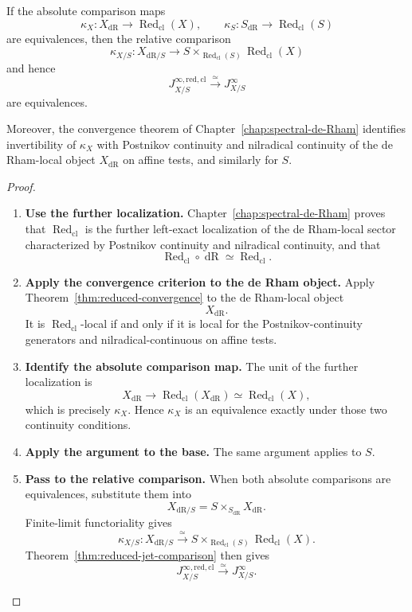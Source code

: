 \begin{corollary}
If the absolute comparison maps
\[
  \kappa_X:
  X_{\mathrm{dR}}
  \longrightarrow
  \operatorname{Red}_{\mathrm{cl}}(X),
  \qquad
  \kappa_S:
  S_{\mathrm{dR}}
  \longrightarrow
  \operatorname{Red}_{\mathrm{cl}}(S)
\]
are equivalences, then the relative comparison
\[
  \kappa_{X/S}:X_{\mathrm{dR}/S}\to S\times_{\operatorname{Red}_{\mathrm{cl}}(S)}\operatorname{Red}_{\mathrm{cl}}(X)
\]
and hence
\[
  J^{\infty,\mathrm{red,cl}}_{X/S}
  \xrightarrow{\simeq}
  J^\infty_{X/S}
\]
are equivalences.

Moreover, the convergence theorem of
Chapter~\ref{chap:spectral-de-Rham} identifies invertibility of \(\kappa_X\)
with Postnikov continuity and nilradical continuity of the de Rham-local object
\(X_{\mathrm{dR}}\) on affine tests, and similarly for \(S\).
\end{corollary}

\begin{proof}
\leavevmode
\begin{enumerate}[label=\textup{(\arabic*)}]
    \item \textbf{Use the further localization.}
Chapter~\ref{chap:spectral-de-Rham} proves that
\(\operatorname{Red}_{\mathrm{cl}}\) is the further left-exact localization of
the de Rham-local sector characterized by Postnikov continuity and nilradical
continuity, and that
\[
  \operatorname{Red}_{\mathrm{cl}}\circ\operatorname{dR}
  \simeq
  \operatorname{Red}_{\mathrm{cl}}.
\]

    \item \textbf{Apply the convergence criterion to the de Rham object.}
Apply Theorem~\ref{thm:reduced-convergence} to the de Rham-local object
\[
  X_{\mathrm{dR}}.
\]
It is \(\operatorname{Red}_{\mathrm{cl}}\)-local if and only if it is local for
the Postnikov-continuity generators and nilradical-continuous on affine tests.

    \item \textbf{Identify the absolute comparison map.}
The unit of the further localization is
\[
  X_{\mathrm{dR}}
  \longrightarrow
  \operatorname{Red}_{\mathrm{cl}}(X_{\mathrm{dR}})
  \simeq
  \operatorname{Red}_{\mathrm{cl}}(X),
\]
which is precisely \(\kappa_X\). Hence \(\kappa_X\) is an equivalence exactly
under those two continuity conditions.

    \item \textbf{Apply the argument to the base.}
The same argument applies to \(S\).

    \item \textbf{Pass to the relative comparison.}
When both absolute comparisons are equivalences, substitute them into
\[
  X_{\mathrm{dR}/S}
  =
  S\times_{S_{\mathrm{dR}}}X_{\mathrm{dR}}.
\]
Finite-limit functoriality gives
\[
  \kappa_{X/S}:
  X_{\mathrm{dR}/S}
  \xrightarrow{\simeq}
  S\times_{\operatorname{Red}_{\mathrm{cl}}(S)}\operatorname{Red}_{\mathrm{cl}}(X).
\]
Theorem~\ref{thm:reduced-jet-comparison} then gives
\[
  J^{\infty,\mathrm{red,cl}}_{X/S}
  \xrightarrow{\simeq}
  J^\infty_{X/S}.
\]
\end{enumerate}
\end{proof}

